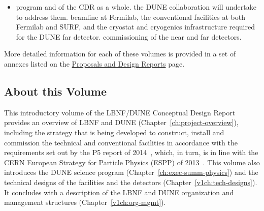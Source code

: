 \begin{itemize}

\item program and of the CDR as a whole.
the DUNE collaboration will undertake to address them.
beamline at Fermilab, the conventional facilities at both Fermilab and SURF, and the cryostat
 and cryogenics infrastructure required for the DUNE far detector.
commissioning of the near and far detectors. 
\end{itemize}

More detailed information for each of these volumes is provided in a set of annexes listed on the \href{https://web.fnal.gov/project/LBNF/SitePages/Proposals%20and%20Design%20Reports.aspx}{Proposals and Design Reports} 
page. 


\subsection{About this Volume}

This introductory volume of the LBNF/DUNE Conceptual Design Report provides an overview of LBNF and
DUNE (Chapter~\ref{ch:project-overview}), including the strategy that is being developed to construct, install and commission the technical and conventional facilities in accordance with the requirements set out by the P5 report of 2014~\cite{p5report2014}, which, in turn, is in line with the CERN
European Strategy for Particle Physics (ESPP) of 2013~\cite{ESPP-2012}. This volume also introduces the DUNE science program (Chapter~\ref{ch:exec-summ-physics}) and the technical designs of the facilities and the detectors 
(Chapter~\ref{v1ch:tech-designs}). It concludes with a description of the LBNF and DUNE organization and management structures (Chapter~\ref{v1ch:org-mgmt}).



